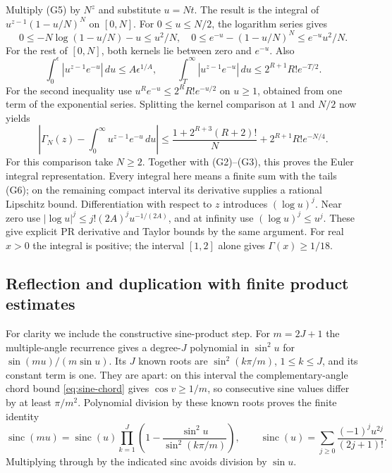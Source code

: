 Multiply (G5) by $N^z$ and substitute $u=Nt$. The result is the integral of
$u^{z-1}(1-u/N)^N$ on $[0,N]$. For $0\le u\le N/2$, the logarithm
series gives
\[
 0\le -N\log(1-u/N)-u\le u^2/N,
 \quad
 0\le e^{-u}-(1-u/N)^N\le e^{-u}u^2/N.
\]
For the rest of $[0,N]$, both kernels lie between zero and $e^{-u}$.
Also
\[
 \int_0^\epsilon |u^{z-1}e^{-u}|\,du\le A\epsilon^{1/A},\qquad
 \int_T^\infty |u^{z-1}e^{-u}|\,du
       \le2^{R+1}R!e^{-T/2}.                   \tag{G6}\label{eq:gamma-integral-tails}
\]
For the second inequality use $u^R e^{-u}\le2^RR!e^{-u/2}$ on
$u\ge1$, obtained from one term of the exponential series. Splitting the
kernel comparison at $1$ and $N/2$ now yields
\[
 \left|\Gamma_N(z)-\int_0^\infty u^{z-1}e^{-u}\,du\right|
 \le\frac{1+2^{R+3}(R+2)!}{N}+2^{R+1}R!e^{-N/4}.
\]
For this comparison take $N\ge2$. Together with (G2)--(G3), this proves the Euler integral representation.
Every integral here means a finite sum with the tails (G6); on the
remaining compact interval its derivative supplies a rational Lipschitz
bound. Differentiation with respect to $z$ introduces $(\log u)^j$.
Near zero use
$|\log u|^j\le j!(2A)^j u^{-1/(2A)}$, and at infinity use
$(\log u)^j\le u^j$. These give explicit PR derivative and Taylor
bounds by the same argument.
For real $x>0$ the integral is positive; the interval $[1,2]$ alone
gives $\Gamma(x)\ge1/18$.

\subsection{Reflection and duplication with finite product estimates}
For clarity we include the constructive sine-product step. For
$m=2J+1$ the multiple-angle recurrence gives a degree-$J$ polynomial in
$\sin^2u$ for $\sin(mu)/(m\sin u)$. Its $J$ known roots are
$\sin^2(k\pi/m)$, $1\le k\le J$, and its constant term is one.
They are apart: on this interval the complementary-angle chord bound
\eqref{eq:sine-chord} gives $\cos v\ge1/m$, so consecutive sine
values differ by at least $\pi/m^2$. Polynomial division by these
known roots proves the finite identity
\[
 \operatorname{sinc}(mu)=\operatorname{sinc}(u)
       \prod_{k=1}^{J}\left(1-\frac{\sin^2u}{\sin^2(k\pi/m)}\right),
 \qquad \operatorname{sinc}(u)=\sum_{j\ge0}\frac{(-1)^ju^{2j}}{(2j+1)!}.
 \tag{G7}\label{eq:finite-sine-product}
\]
Multiplying through by the indicated sinc avoids division by $\sin u$.

